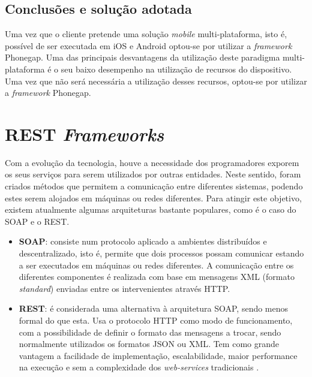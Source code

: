 \subsection{Conclusões e solução adotada}



Uma vez que o cliente pretende uma solução \textit{mobile} multi-plataforma, isto é, possível de ser executada em iOS e Android optou-se por utilizar a \textit{framework} Phonegap.  Uma das principais desvantagens da utilização deste paradigma multi-plataforma é o seu baixo desempenho na utilização de recursos do dispositivo. Uma vez que não será necessária a utilização desses recursos, optou-se por utilizar a \textit{framework} Phonegap. 




\section{REST \textit{Frameworks}}


Com a evolução da tecnologia, houve a necessidade dos programadores exporem os seus serviços para serem utilizados por outras entidades. Neste sentido, foram criados métodos que permitem a comunicação  entre diferentes sistemas, podendo estes serem alojados em máquinas ou redes diferentes. Para atingir este objetivo, existem atualmente algumas arquiteturas bastante populares, como é o caso do \ac{SOAP} e o \ac{REST}. 


\begin{itemize}
	\item \textbf{\ac{SOAP}}: consiste num protocolo aplicado a ambientes distribuídos e descentralizado, isto é, permite que dois processos possam comunicar estando a ser executados em máquinas ou redes diferentes\cite{Kang2015}. A comunicação entre os diferentes componentes é realizada com base em mensagens \ac{XML} (formato \textit{standard}) enviadas entre os intervenientes através \ac{HTTP}.
	
	
	\item \textbf{\ac{REST}}: é considerada uma alternativa à arquitetura \ac{SOAP}, sendo menos formal do que esta. Usa o protocolo \ac{HTTP} como modo de funcionamento, com a possibilidade de definir o formato das mensagens a trocar, sendo normalmente utilizados os formatos \ac{JSON} ou \ac{XML}. Tem como grande vantagem a facilidade de implementação, escalabilidade, maior performance na execução e sem a complexidade dos \textit{web-services} tradicionais \cite{restpaper}. 
	
	
\end{itemize}

